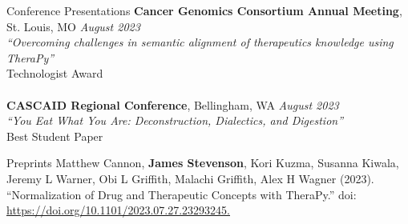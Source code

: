 \documentclass{cv} %
\begin{document}

\begin{rSection}{Conference Presentations}
{\bf Cancer Genomics Consortium Annual Meeting}{, St. Louis, MO} \hfill {\em August 2023}\\
{\em ``Overcoming challenges in semantic alignment of therapeutics knowledge using TheraPy''}\\
{Technologist Award}\\
\\
{\bf CASCAID Regional Conference}{, Bellingham, WA} \hfill {\em August 2023}\\
{\em ``You Eat What You Are: Deconstruction, Dialectics, and Digestion''}\\
{Best Student Paper}

\end{rSection}


\begin{rSection}{Preprints}
{Matthew Cannon, \textbf{James Stevenson}, Kori Kuzma, Susanna Kiwala, Jeremy L Warner, Obi L Griffith, Malachi Griffith, Alex H Wagner (2023). ``Normalization of Drug and Therapeutic Concepts with TheraPy.'' doi: \url{https://doi.org/10.1101/2023.07.27.23293245.}}
\\
\end{rSection}
\end{document}
